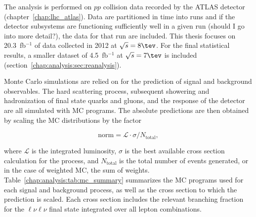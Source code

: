 
The analysis is performed on $pp$ collision data recorded by the ATLAS
detector (chapter~\ref{chap:lhc_atlas}). Data are partitioned in
time into runs and if the detector subsystems are functioning
sufficiently well in a given run (should I go into more detail?),
the data for that run are included. This thesis focuses on
20.3~fb$^{-1}$ of data collected in 2012 at $\sqrts =8 \tev$. For the
final statistical results, a smaller dataset of
4.5~fb$^{-1}$ at $\sqrts =7 \tev$ is included
(section~\ref{chap:analysis:sec:reanalysis}).

Monte Carlo simulations are relied on for the prediction of signal and
background observables. The hard scattering process, subsequent
showering and hadronization of final state quarks and gluons, and the
response of the detector are all simulated with MC programs. The
absolute predictions are then obtained by scaling the MC distributions
by the factor 

\begin{equation}
\textrm{norm} = \mathcal{L}\cdot{\sigma}/N_{\mathrm{total}},
\label{chap:analysis:equation:mc_norm}
\end{equation}

\noindent
where $\mathcal{L}$ is the integrated luminosity, $\sigma$ is the best
available cross section calculation for the process, and
$N_{\mathrm{total}}$ is the total number of events generated, or in
the case of weighted MC, the sum of
weights. Table~\ref{chap:analysis:tab:mc_summary} summarizes the MC
programs used for each signal and background process, as well as the
cross section to which the prediction is scaled. Each cross section
includes the relevant branching fraction for the $\ell\nu\ell\nu$
final state integrated over all lepton combinations. 

